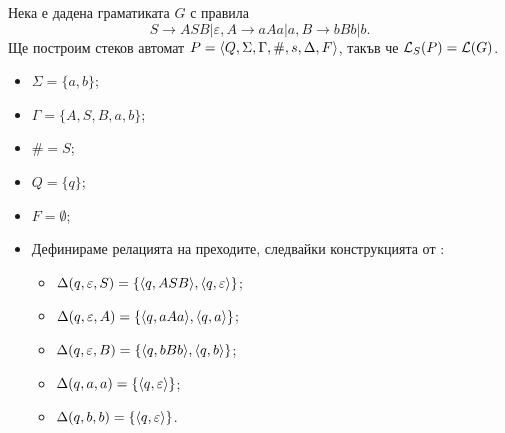 \begin{example}
  Нека е дадена граматиката $G$ с правила 
  \[S\rightarrow ASB\vert \varepsilon, A\rightarrow aAa\vert a, B\rightarrow bBb\vert b.\]
  Ще построим стеков автомат $P = \langle{Q,\Sigma,\Gamma,\#,s,\Delta,F}\rangle$, такъв че $\mathcal{L}_S(P) = \mathcal{L}(G)$.
  \begin{itemize}
  \item
    $\Sigma = \{a,b\}$;
  \item 
    $\Gamma = \{A,S,B,a,b\}$;
  \item
    $\# = S$;
  \item
    $Q = \{q\}$;
  \item
    $F = \emptyset$;
  \item
    Дефинираме релацията на преходите, следвайки конструкцията от :
    \begin{itemize}
    \item 
      $\Delta(q,\varepsilon, S) = \{\langle{q,ASB}\rangle, \langle{q,\varepsilon}\rangle\}$;
    \item
      $\Delta(q, \varepsilon, A) = \{\langle{q, aAa}\rangle, \langle{q, a}\rangle\}$;
    \item
      $\Delta(q, \varepsilon, B) = \{\langle{q, bBb}\rangle, \langle{q, b}\rangle\}$;
    \item
      $\Delta(q, a, a) = \{\langle{q,\varepsilon}\rangle\}$;
    \item
      $\Delta(q, b, b) = \{\langle{q,\varepsilon}\rangle\}$.
    \end{itemize}
  \end{itemize}
\end{example}


